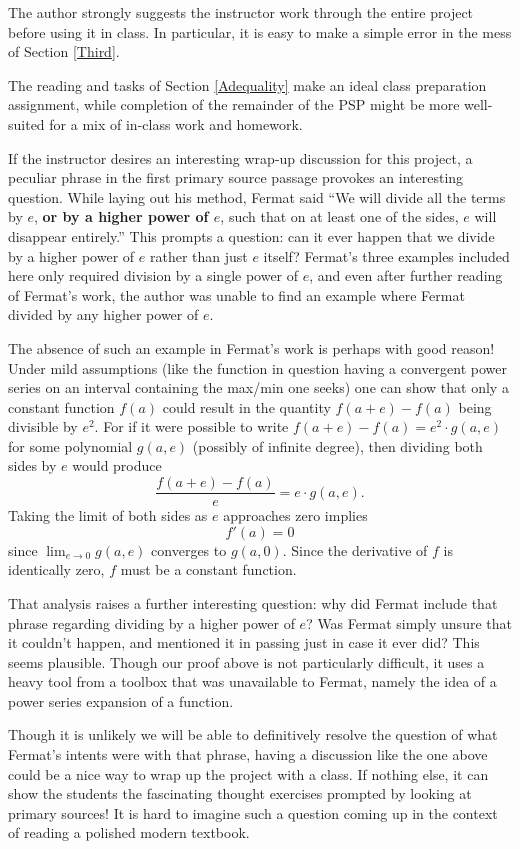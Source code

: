 \documentclass[11pt]{article}
\begin{document}
The author strongly suggests the instructor work through the entire project before using it in class. In particular, it is easy to make a simple error in the mess of Section \ref{Third}. 


The reading and tasks of Section \ref{Adequality} make an ideal class preparation assignment, while completion of the remainder of the PSP might be more well-suited for a mix of in-class work and homework.


If the instructor desires an interesting wrap-up discussion for this project, a peculiar phrase in the first primary source passage provokes an interesting question.  While laying out his method, Fermat said ``{\sf We will divide all the terms by $e$, {\bf or by a higher power of $e$}, such that on at least one of the sides, $e$ will disappear entirely.}''  This prompts a question: can it ever happen that we divide by a higher power of $e$ rather than just $e$ itself?  Fermat's three examples included here only required division by a single power of $e$, and even after further reading of Fermat's work, the author was unable to find an example where Fermat divided by any higher power of $e$.

The absence of such an example in Fermat's work is perhaps with good reason!  Under mild assumptions (like the function in question having a convergent power series on an interval containing the max/min one seeks) one can show that only a constant function $f(a)$ could result in the quantity $f(a+e)-f(a)$ being divisible by $e^2$.  For if it were possible to write $f(a+e)-f(a)= e^2\cdot g(a,e)$ for some polynomial $g(a,e)$ (possibly of infinite degree), then dividing both sides by $e$ would produce $$\frac{f(a+e)-f(a)}{e}=e\cdot g(a,e).$$  Taking the limit of both sides as $e$ approaches zero implies $$f'(a)=0$$ since $\lim_{e\to 0}g(a,e)$ converges to $g(a,0)$.  Since the derivative of $f$ is identically zero, $f$ must be a constant function.

That analysis raises a further  interesting question: why did Fermat include that phrase regarding dividing by a higher power of $e$?  Was Fermat simply unsure that it couldn't happen, and mentioned it in passing just in case it ever did?  This seems plausible. Though our proof above is not particularly difficult, it uses a heavy tool from a toolbox that was unavailable to Fermat, namely the idea of a power series expansion of a function.  

Though it is unlikely we will be able to definitively resolve the question of what Fermat's intents were with that phrase, having a discussion like the one above could be a nice way to wrap up the project with a class.  If nothing else, it can show the students the fascinating thought exercises prompted by looking at primary sources!  It is hard to imagine such a question coming up in the context of reading a polished modern textbook.
\end{document}

